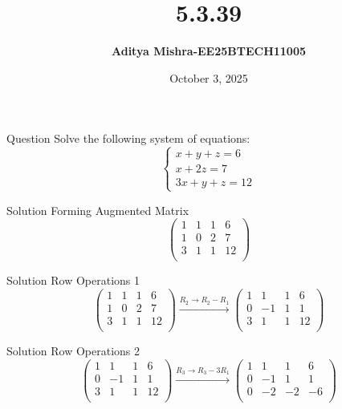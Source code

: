 \documentclass{beamer}
\title{\textbf{5.3.39}}
\author{\textbf{Aditya Mishra-EE25BTECH11005}}
\date{October 3, 2025}
\begin{document}
\begin{frame}
\titlepage
\end{frame}

\begin{frame}{Question}
Solve the following system of equations:
\[
\begin{cases}
x + y + z = 6 \\
x + 2z = 7 \\
3x + y + z = 12
\end{cases}
\]
\end{frame}

\begin{frame}{Solution}
	Forming Augmented Matrix
\[
\left(
\begin{array}{ccc|c}
1 & 1 & 1 & 6 \\
1 & 0 & 2 & 7 \\
3 & 1 & 1 & 12 \\
\end{array}
\right)
\]
\end{frame}

\begin{frame}{Solution}
		Row Operations 1
\[
\left(
\begin{array}{ccc|c}
1 & 1 & 1 & 6 \\
1 & 0 & 2 & 7 \\
3 & 1 & 1 & 12 \\
\end{array}
\right)
\xrightarrow{R_2 \rightarrow R_2 - R_1}
\left(
\begin{array}{ccc|c}
1 & 1 & 1 & 6 \\
0 & -1 & 1 & 1 \\
3 & 1 & 1 & 12 \\
\end{array}
\right)
\]
\end{frame}

\begin{frame}{Solution}
	Row Operations 2
\[
\left(
\begin{array}{ccc|c}
1 & 1 & 1 & 6 \\
0 & -1 & 1 & 1 \\
3 & 1 & 1 & 12 \\
\end{array}
\right)
\xrightarrow{R_3 \rightarrow R_3 - 3R_1}
\left(
\begin{array}{ccc|c}
1 & 1 & 1 & 6 \\
0 & -1 & 1 & 1 \\
0 & -2 & -2 & -6 \\
\end{array}
\right)
\]
\end{frame}
\end{document}
